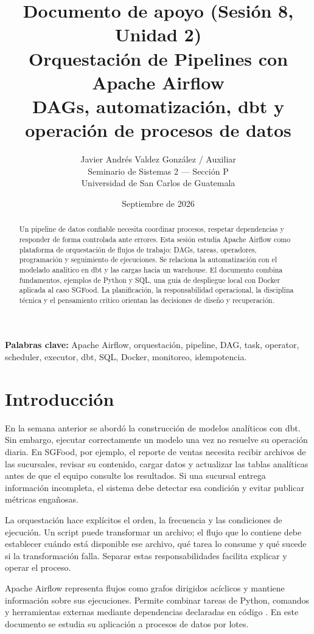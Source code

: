 \documentclass[12pt]{article}
\title{\textbf{Documento de apoyo (Sesión 8, Unidad 2)}\\
\large Orquestación de Pipelines con Apache Airflow\\
\normalsize DAGs, automatización, dbt y operación de procesos de datos}
\author{Javier Andrés Valdez González / Auxiliar \\
\small Seminario de Sistemas 2 --- Sección P \\
\small Universidad de San Carlos de Guatemala}
\date{Septiembre de 2026}
\begin{document}
\maketitle
\begin{abstract}
Un pipeline de datos confiable necesita coordinar procesos, respetar dependencias y responder de forma controlada ante errores. Esta sesión estudia Apache Airflow como plataforma de orquestación de flujos de trabajo: DAGs, tareas, operadores, programación y seguimiento de ejecuciones. Se relaciona la automatización con el modelado analítico en dbt y las cargas hacia un warehouse. El documento combina fundamentos, ejemplos de Python y SQL, una guía de despliegue local con Docker aplicada al caso SGFood. La planificación, la responsabilidad operacional, la disciplina técnica y el pensamiento crítico orientan las decisiones de diseño y recuperación.
\end{abstract}
\textbf{Palabras clave:} Apache Airflow, orquestación, pipeline, DAG, task, operator, scheduler, executor, dbt, SQL, Docker, monitoreo, idempotencia.
\newpage
\tableofcontents

\section{Introducción}
En la semana anterior se abordó la construcción de modelos analíticos con dbt. Sin embargo, ejecutar correctamente un modelo una vez no resuelve su operación diaria. En SGFood, por ejemplo, el reporte de ventas necesita recibir archivos de las sucursales, revisar su contenido, cargar datos y actualizar las tablas analíticas antes de que el equipo consulte los resultados. Si una sucursal entrega información incompleta, el sistema debe detectar esa condición y evitar publicar métricas engañosas.

La orquestación hace explícitos el orden, la frecuencia y las condiciones de ejecución. Un script puede transformar un archivo; el flujo que lo contiene debe establecer cuándo está disponible ese archivo, qué tarea lo consume y qué sucede si la transformación falla. Separar estas responsabilidades facilita explicar y operar el proceso.

Apache Airflow representa flujos como grafos dirigidos acíclicos y mantiene información sobre sus ejecuciones. Permite combinar tareas de Python, comandos y herramientas externas mediante dependencias declaradas en código \cite{airflow_overview}. En este documento se estudia su aplicación a procesos de datos por lotes.
\end{document}
